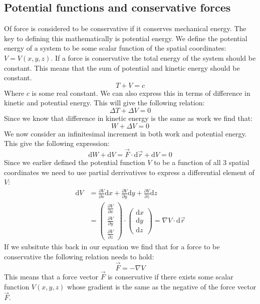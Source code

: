 \documentclass[11pt, a4paper]{article}
\renewcommand*{\d}{\text{d}}
\numberwithin{equation}{section}
\numberwithin{figure}{section}
\begin{document}
\subsection{Potential functions and conservative forces}
Of force is considered to be conservative if it conserves mechanical energy. The key to defining this mathematically is potential energy. We define the potential energy of a system to be some scalar function of the spatial coordinates: $V = V(x, y, z)$. If a force is conservative the total energy of the system should be constant. This means that the sum of potential and kinetic energy should be constant.
\begin{equation}
  T + V = c
\end{equation}
Where $c$ is some real constant. We can also express this in terms of difference in kinetic and potential energy. This will give the following relation:
\begin{equation}
  \Delta T + \Delta V = 0
\end{equation}
Since we know that difference in kinetic energy is the same as work we find that:
\begin{equation}
  W + \Delta V = 0
\end{equation}
We now consider an infinitesimal increment in both work and potential energy. This give the following expression:
\begin{equation}
  \d W + \d V = \vec{F}\cdot\d\vec{r} + \d V = 0
\end{equation}
Since we earlier defined the potential function $V$ to be a function of all $3$ spatial coordinates we need to use partial derrivatives to express a differential element of $V$:
\begin{align}
  \d V &= \frac{\partial V}{\partial x}\d x + \frac{\partial V}{\partial y}\d y + \frac{\partial V}{\partial z}\d z \\
  &=
  \begin{pmatrix}
    \frac{\partial V}{\partial x}\\
    \frac{\partial V}{\partial y}\\
    \frac{\partial V}{\partial z}
  \end{pmatrix}
  \cdot
  \begin{pmatrix}
    \d x\\
    \d y\\
    \d z
  \end{pmatrix}
  = \nabla V \cdot \d \vec{r}
\end{align}
If we subsitute this back in our equation we find that for a force to be conservative the following relation needs to hold:
\begin{equation}
  \vec{F} = -\nabla V
\end{equation}
This means that a force vector $\vec{F}$ is conservative if there exists some scalar function $V(x, y, z)$ whose gradient is the same as the negative of the force vector $\vec{F}$. 
\end{document}
